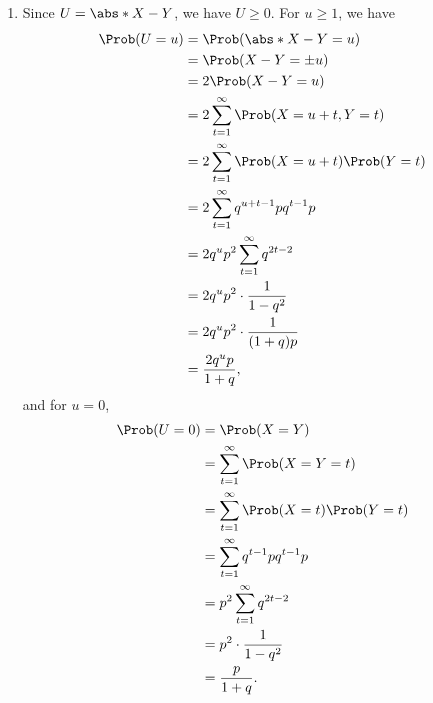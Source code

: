 \begin{enumerate}
    \item Since \(U = \abs*{X - Y}\), we have \(U \geq 0\). For \(u \geq 1\), we have
          \begin{align*}
              \Prob(U = u) & = \Prob(\abs*{X - Y} = u)                               \\
                           & = \Prob(X - Y = \pm u)                                  \\
                           & = 2 \Prob(X - Y = u)                                    \\
                           & = 2 \sum_{t = 1}^{\infty} \Prob(X = u + t, Y = t)       \\
                           & = 2 \sum_{t = 1}^{\infty} \Prob(X = u + t) \Prob(Y = t) \\
                           & = 2 \sum_{t = 1}^{\infty} q^{u + t - 1} p q^{t - 1} p   \\
                           & = 2 q^u p^2 \sum_{t = 1}^{\infty} q^{2t - 2}            \\
                           & = 2 q^u p^2 \cdot \frac{1}{1 - q^2}                     \\
                           & = 2 q^u p^2 \cdot \frac{1}{(1 + q)p}                    \\
                           & = \frac{2 q^u p}{1 + q},
          \end{align*}
          and for \(u = 0\),
          \begin{align*}
              \Prob(U = 0) & = \Prob(X = Y)                                    \\
                           & = \sum_{t = 1}^{\infty} \Prob(X = Y = t)          \\
                           & = \sum_{t = 1}^{\infty} \Prob(X = t) \Prob(Y = t) \\
                           & = \sum_{t = 1}^{\infty} q^{t - 1} p q^{t - 1} p   \\
                           & = p^2 \sum_{t = 1}^{\infty} q^{2t - 2}            \\
                           & = p^2 \cdot \frac{1}{1 - q^2}                     \\
                           & = \frac{p}{1 + q}.
          \end{align*}


\end{enumerate}
